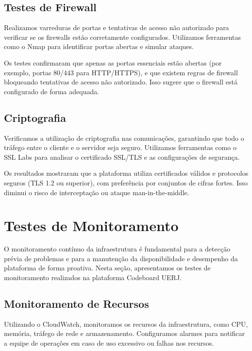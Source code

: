 \subsection{Testes de Firewall}

Realizamos varreduras de portas e tentativas de acesso não autorizado para verificar se os firewalls estão corretamente configurados. Utilizamos ferramentas como o Nmap para identificar portas abertas e simular ataques.


Os testes confirmaram que apenas as portas essenciais estão abertas (por exemplo, portas 80/443 para HTTP/HTTPS), e que existem regras de firewall bloqueando tentativas de acesso não autorizado. Isso sugere que o firewall está configurado de forma adequada.

\subsection{Criptografia}

Verificamos a utilização de criptografia nas comunicações, garantindo que todo o tráfego entre o cliente e o servidor seja seguro. Utilizamos ferramentas como o SSL Labs para analisar o certificado SSL/TLS e as configurações de segurança.

Os resultados mostraram que a plataforma utiliza certificados válidos e protocolos seguros (TLS 1.2 ou superior), com preferência por conjuntos de cifras fortes. Isso diminui o risco de interceptação ou ataque man-in-the-middle.


\section{Testes de Monitoramento}

O monitoramento contínuo da infraestrutura é fundamental para a detecção prévia de problemas e para a manutenção da disponibilidade e desempenho da plataforma de forma proativa. Nesta seção, apresentamos os testes de monitoramento realizados na plataforma Codeboard UERJ.

\subsection{Monitoramento de Recursos}

Utilizando o CloudWatch, monitoramos os recursos da infraestrutura, como CPU, memória, tráfego de rede e armazenamento. Configuramos alarmes para notificar a equipe de operações em caso de uso excessivo ou falhas nos recursos.

